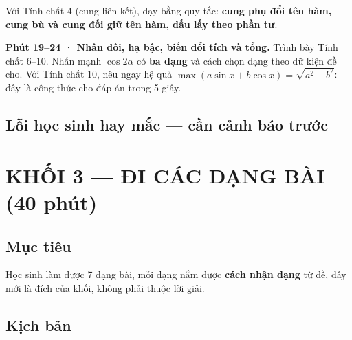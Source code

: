 \documentclass[11pt, a4paper]{article}
\begin{document}
Với Tính chất 4 (cung liên kết), dạy bằng quy tắc: \textbf{cung phụ đổi tên hàm, cung bù và cung đối giữ tên hàm, dấu lấy theo phần tư}.

\textbf{Phút 19–24 · Nhân đôi, hạ bậc, biến đổi tích và tổng.} Trình bày Tính chất 6–10. Nhấn mạnh $\cos 2\alpha$ có \textbf{ba dạng} và cách chọn dạng theo dữ kiện đề cho. Với Tính chất 10, nêu ngay hệ quả $\max(a\sin x + b\cos x) = \sqrt{a^2+b^2}$: đây là công thức cho đáp án trong 5 giây.

\subsection{Lỗi học sinh hay mắc — cần cảnh báo trước}


\section{KHỐI 3 — ĐI CÁC DẠNG BÀI (40 phút)}

\subsection{Mục tiêu}

Học sinh làm được 7 dạng bài, mỗi dạng nắm được \textbf{cách nhận dạng} từ đề, đây mới là đích của khối, không phải thuộc lời giải.

\subsection{Kịch bản}
\end{document}

